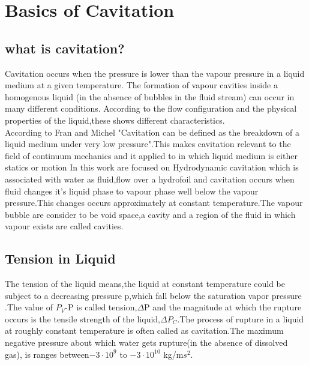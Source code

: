 \chapter{Basics of Cavitation}
\label{chap:chapter1}
\section{what is cavitation?}
Cavitation occurs when the pressure is lower than the vapour pressure in a liquid medium at a given temperature. The formation of vapour cavities inside a homogenous liquid (in the absence of bubbles in the fluid stream) can occur in many different conditions.
According to the flow configuration and the physical properties of the liquid,these shows different characteristics.\\

According to Fran and Michel "Cavitation can be defined as the breakdown of a liquid medium under very low pressure".This makes cavitation relevant to the field of continuum mechanics and it applied to in which liquid medium is either statics or motion 
 In this work are focused on Hydrodynamic cavitation which is associated with water as fluid,flow over a hydrofoil and cavitation occurs when fluid changes it's liquid phase to vapour phase well below the vapour pressure.This changes occurs approximately 
 at constant temperature.The vapour bubble are consider to be void space,a cavity and a region  of the fluid in which vapour exists are called cavities.\\
\section{Tension in Liquid}
The tension of the liquid means,the liquid at 
 constant temperature could be subject to a decreasing pressure p,which fall below the saturation vapor pressure .The value of $P_V$-P is called tension,$\Delta$P and the magnitude at which the rupture
 occurs is the tensile strength of the liquid,$\Delta P_C$.The process of rupture in a liquid at roughly constant temperature is often called as cavitation.The maximum negative pressure about which water gets rupture(in the absence of dissolved gas), is ranges between$-3\cdot 10^9$ to $ -3\cdot 10^{10} $ kg/m$s^2$.
